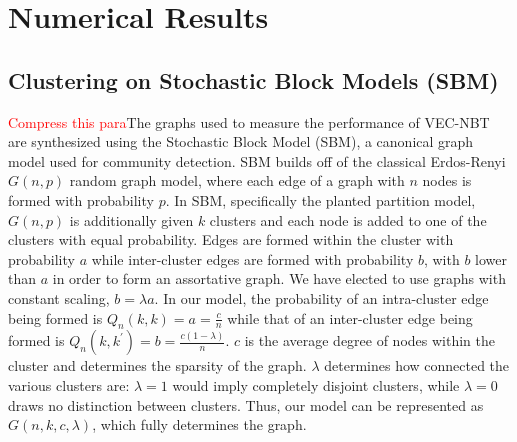 \documentclass{article} %
\begin{document}
%
%

\section{Numerical Results}
\subsection{Clustering on Stochastic Block Models (SBM)}

\textcolor{red}{Compress this para}The graphs used to measure the performance of VEC-NBT are synthesized using the Stochastic Block Model (SBM), a canonical graph model used for community detection. SBM builds off of the classical Erdos-Renyi $G(n,p)$ random graph model, where each edge of a graph with $n$ nodes is formed with probability $p$. In SBM, specifically the planted partition model, $G(n,p)$ is additionally given $k$ clusters and each node is added to one of the clusters with equal probability. Edges are formed within the cluster with probability $a$ while inter-cluster edges are formed with probability $b$, with $b$ lower than $a$ in order to form an assortative graph. We have elected to use graphs with constant scaling, $b = \lambda a$. In our model, the probability of an intra-cluster edge being formed is $Q_n(k,k) = a = \frac{c}{n}$ while that of an inter-cluster edge being formed is $Q_n(k,k^\prime) = b = \frac{c(1-\lambda)}{n}$. $c$ is the average degree of nodes within the cluster and determines the sparsity of the graph. $\lambda$ determines how connected the various clusters are: $\lambda=1$ would imply completely disjoint clusters, while $\lambda=0$ draws no distinction between clusters.  Thus, our model can be represented as $G(n,k,c,\lambda)$, which fully determines the graph.
\end{document}
